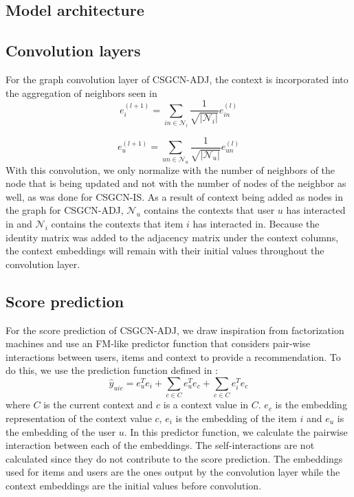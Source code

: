 \subsection{Model architecture}\label{subsec:csgcn_adj_architecture}

\subsection{Convolution layers}\label{subsec:csgcn_adj_conv_layer}
For the graph convolution layer of CSGCN-ADJ, the context is incorporated into the aggregation of neighbors seen in 
\begin{equation}\label{eq:csgcn_adj_gc_layer_item}
    e_{i}^{(l+1)}=\sum_{in\in \mathcal{N}_{i}}\frac{1}{\sqrt{|\mathcal{N}_{i}|} }e_{in}^{(l)}
\end{equation}

\begin{equation}\label{eq:csgcn_adj_gc_layer_user}
     e_{u}^{(l+1)}=\sum_{un\in \mathcal{N}_{u}}\frac{1}{ \sqrt{|\mathcal{N}_{u}|}}e_{un}^{(l)}
\end{equation}
With this convolution, we only normalize with the number of neighbors of the node that is being updated and not with the number of nodes of the neighbor as well, as was done for CSGCN-IS.
As a result of context being added as nodes in the graph for CSGCN-ADJ, $\mathcal{N}_{u}$ contains the contexts that user $u$ has interacted in and $\mathcal{N}_{i}$ contains the contexts that item $i$ has interacted in.
Because the identity matrix was added to the adjacency matrix under the context columns, the context embeddings will remain with their initial values throughout the convolution layer.

\subsection{Score prediction}\label{subsec:csgcn_adj_score_pred}
For the score prediction of CSGCN-ADJ, we draw inspiration from factorization machines and use an FM-like predictor function that considers pair-wise interactions between users, items and context to provide a recommendation.
To do this, we use the prediction function defined in :
\begin{equation}\label{eq:csgcn_adj_scorepred}
    \hat{y}_{uic} = e_u^Te_i + \sum_{c \in C}e_u^Te_{c} + \sum_{c \in C}e_i^Te_{c}
\end{equation}
where $C$ is the current context and $c$ is a context value in $C$.
$e_{c}$ is the embedding representation of the context value $c$, $e_i$ is the embedding of the item $i$ and $e_u$ is the embedding of the user $u$.
In this predictor function, we calculate the pairwise interaction between each of the embeddings. The self-interactions are not calculated since they do not contribute to the score prediction. The embeddings used for items and users are the ones output by the convolution layer while the context embeddings are the initial values before convolution.

